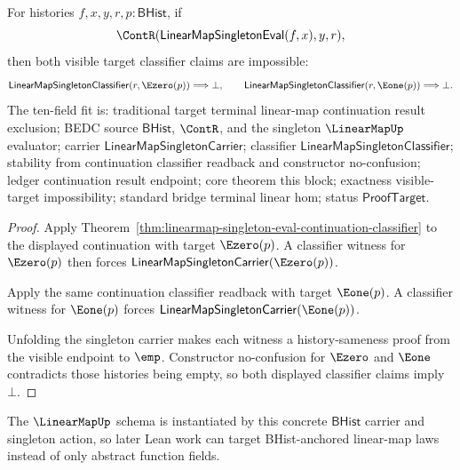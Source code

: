 \begin{theorem}
\label{thm:linearmap-singleton-eval-continuation-visible-target-exclusion}
For histories $f,x,y,r,p:\mathsf{BHist}$, if
$$
\ContR(\mathsf{LinearMapSingletonEval}(f,x),y,r),
$$
then both visible target classifier claims are impossible:
$$
\mathsf{LinearMapSingletonClassifier}(r,\Ezero(p))\Longrightarrow\bot,
\qquad
\mathsf{LinearMapSingletonClassifier}(r,\Eone(p))\Longrightarrow\bot.
$$
The ten-field fit is: traditional target terminal linear-map continuation
result exclusion; BEDC source $\mathsf{BHist}$, $\ContR$, and the singleton
$\LinearMapUp$ evaluator; carrier $\mathsf{LinearMapSingletonCarrier}$;
classifier $\mathsf{LinearMapSingletonClassifier}$; stability from
continuation classifier readback and constructor no-confusion; ledger
continuation result endpoint; core theorem this block; exactness visible-target
impossibility; standard bridge terminal linear hom; status
$\mathsf{ProofTarget}$.
\end{theorem}
\begin{proof}
Apply Theorem~\ref{thm:linearmap-singleton-eval-continuation-classifier} to
the displayed continuation with target $\Ezero(p)$. A classifier witness for
$\Ezero(p)$ then forces
$\mathsf{LinearMapSingletonCarrier}(\Ezero(p))$.

Apply the same continuation classifier readback with target $\Eone(p)$. A
classifier witness for $\Eone(p)$ forces
$\mathsf{LinearMapSingletonCarrier}(\Eone(p))$.

Unfolding the singleton carrier makes each witness a history-sameness proof
from the visible endpoint to $\emp$. Constructor no-confusion for $\Ezero$ and
$\Eone$ contradicts those histories being empty, so both displayed classifier
claims imply $\bot$.
\end{proof}



The $\LinearMapUp$ schema is instantiated by this concrete $\mathsf{BHist}$
carrier and singleton action, so later Lean work can target BHist-anchored
linear-map laws instead of only abstract function fields.


